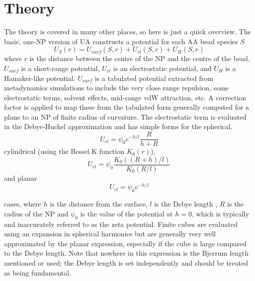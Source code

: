 \documentclass[10pt,a4paper,onecolumn]{report}
\begin{document}
\section{Theory}
The theory is covered in many other places, so here is just a quick overview. The basic, one-NP version of UA constructs a potential for each AA bead species $S$
\begin{equation}
U_S(r) =   U_{surf}(S,r) + U_{el}(S,r) +  U_H(S,r)
\end{equation} 
 where $r$ is the distance between the centre of the NP and the centre of the bead, $U_{surf}$ is a short-range potential, $U_{el}$ is an electrostatic potential, and  $U_H$ is a Hamaker-like potential. $U_{surf}$ is a tabulated potential extracted from metadynamics simulations to include the very close range repulsion, some electrostatic terms, solvent effects, mid-range vdW attraction, etc. A correction factor is applied to map these from the tabulated form generally computed for a plane to an NP of finite radius of curvature. The electrostatic term is evaluated in the Debye-Huckel approximation and has simple forms for the spherical,
 \begin{equation}
 U_{el} = \psi_0 e^{-h/l}\frac{R}{h + R}
 \end{equation}
  cylindrical (using the Bessel K function $K_0(r)$),
 \begin{equation}
 U_{el} = \psi_0  \frac{K_0( (R + h)/l)}{K_0(R/l)}
 \end{equation}
and planar
  \begin{equation}
 U_{el} = \psi_0 e^{-h/l}  
 \end{equation}

 cases, where $h$ is the distance from the surface, $l$ is the Debye length , $R$ is the radius of the NP and $\psi_0$ is the value of the potential at $h=0$, which is typically and inaccurately referred to as the zeta potential. Finite cubes are evaluated using an expansion in spherical harmonics but are generally very well approximated by the planar expression, especially if the cube is large compared to the Debye length.  Note that nowhere in this expression is the Bjerrum length mentioned or used; the Debye length is set independently and should be treated as being fundamental. 

 
 
\end{document}
